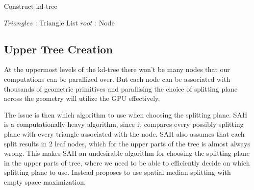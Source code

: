 \begin{algorithm}
  \caption{Construct kd-tree}
  \label{alg:constructKDTree}
  \begin{algorithmic}
              {$Triangles$ : Triangle List}
              {$root$ : Node}{
                \ENDFOR
                \STATE{}
                \ENDWHILE
                \STATE{}
                \ENDWHILE
              }
  \end{algorithmic}
\end{algorithm}

\subsection{Upper Tree Creation}\label{sec:upperNodes}


At the uppermost levels of the kd-tree there won't be many nodes that
our computations can be parallized over. But each node can be
associated with thousands of geometric primitives and parallising the
choice of splitting plane across the geometry will utilize the GPU
effectively.


The issue is then which algorithm to use when choosing the splitting
plane. SAH is a computationally heavy algorithm, since it compares
every possibly splitting plane with every triangle associated with the
node. SAH also assumes that each split results in 2 leaf nodes, which
for the upper parts of the tree is almost always wrong. This makes SAH
an undesirable algorithm for choosing the splitting plane in the upper
parts of tree, where we need to be able to efficiently decide on which
splitting plane to use. Instead \zhou{} proposes to use spatial median
splitting with empty space maximization.

